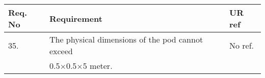 \begin{center}
    \begin{tabular}{ | l | p{9cm} | l |}
    \hline
    Req. No & Requirement  & UR ref \\ \hline
    35. & The physical dimensions of the pod cannot exceed& No ref.\\ &0.5$\times$0.5$\times$5 meter. &\\ \hline
    \end{tabular}
\end{center}
